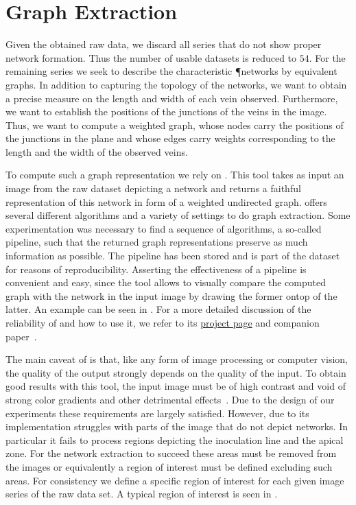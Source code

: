 	\section{Graph Extraction}

		Given the obtained raw data, we discard all series that do not show proper network formation. Thus the number of usable datasets is reduced to $54$. For the remaining series we seek to describe the characteristic \P networks by equivalent graphs. In addition to capturing the topology of the networks, we want to obtain a precise measure on the length and width of each vein observed. Furthermore, we want to establish the positions of the junctions of the veins in the image. Thus, we want to compute a weighted graph, whose nodes carry the positions of the junctions in the plane and whose edges carry weights corresponding to the length and the width of the observed veins. 

		To compute such a graph representation we rely on \NEFI. This tool takes as input an image from the raw dataset depicting a network and returns a faithful representation of this network in form of a weighted undirected graph. \NEFI offers several different algorithms and a variety of settings to do graph extraction. Some experimentation was necessary to find a sequence of algorithms, a so-called pipeline, such that the returned graph representations preserve as much information as possible. The pipeline has been stored and is part of the dataset for reasons of reproducibility. Asserting the effectiveness of a pipeline is convenient and easy, since the tool allows to visually compare the computed graph with the network in the input image by drawing the former ontop of the latter. An example can be seen in . For a more detailed discussion of the reliability of \NEFI and how to use it, we refer to its \href{http://nefi.mpi-inf.mpg.de}{project page} and companion paper~\cite{dirnberger2015nefi}.

		The main caveat of \NEFI is that, like any form of image processing or computer vision, the quality of the output strongly depends on the quality of the input. To obtain good results with this tool, the input image must be of high contrast and void of strong color gradients and other detrimental effects~\cite{dirnberger2015nefi}. Due to the design of our experiments these requirements are largely satisfied. However, due to its implementation \NEFI struggles with parts of the image that do not depict networks. In particular it fails to process regions depicting the inoculation line and the apical zone. For the network extraction to succeed these areas must be removed from the images or equivalently a region of interest must be defined excluding such areas. For consistency we define a specific region of interest for each given image series of the raw data set. A typical region of interest is seen in .

